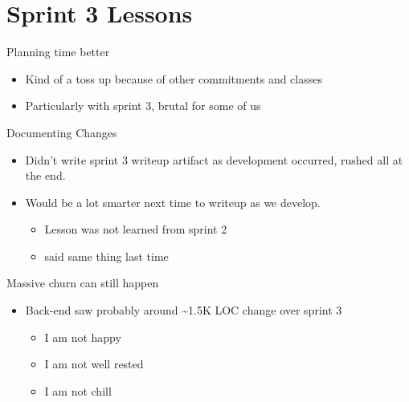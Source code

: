 \documentclass[allowframebreaks]{beamer}
\begin{document}
\section{Sprint 3 Lessons}
\label{sec:orge424a50}
\begin{frame}[label={sec:org18db658}]{Planning time better}
\begin{itemize}
\item Kind of a toss up because of other commitments and classes
\item Particularly with sprint 3, brutal for some of us
\end{itemize}
\end{frame}
\begin{frame}[label={sec:org702f4ba}]{Documenting Changes}
\begin{itemize}
\item Didn't write sprint 3 writeup artifact as development occurred, rushed all at the end.
\item Would be a lot smarter next time to writeup as we develop.
\begin{itemize}
\item Lesson was not learned from sprint 2
\item said same thing last time
\end{itemize}
\end{itemize}
\end{frame}
\begin{frame}[label={sec:orgf6c04ee}]{Massive churn can still happen}
\begin{itemize}
\item Back-end saw probably around \textasciitilde{}1.5K LOC change over sprint 3
\begin{itemize}
\item I am not happy
\item I am not well rested
\item I am not chill
\end{itemize}
\end{itemize}
\end{frame}
\end{document}

